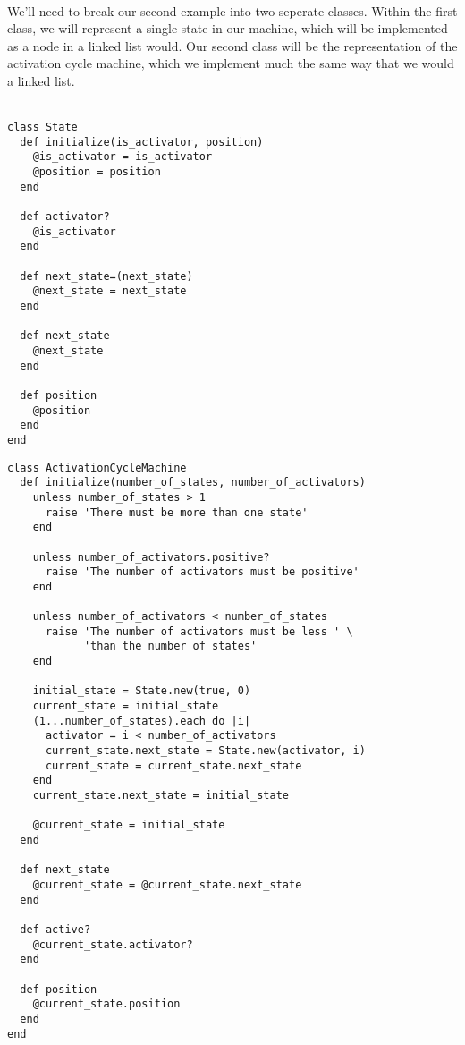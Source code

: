 \documentclass[a4paper,12pt]{article}
\begin{document}
\\
We'll need to break our second example into two seperate classes. Within the first class, we will represent a single state in our machine, which will be implemented as a node in a linked list would. Our second class will be the representation of the activation cycle machine, which we implement much the same way that we would a linked list.\\
\\
\begin{tcolorbox}
\begin{verbatim}
class State
  def initialize(is_activator, position)
    @is_activator = is_activator
    @position = position
  end

  def activator?
    @is_activator
  end
  
  def next_state=(next_state)
  	@next_state = next_state
  end
  
  def next_state
  	@next_state
  end
  
  def position
  	@position
  end
end
\end{verbatim}
\end{tcolorbox}
\begin{tcolorbox}
\begin{verbatim}
class ActivationCycleMachine
  def initialize(number_of_states, number_of_activators)
    unless number_of_states > 1
      raise 'There must be more than one state'
    end

    unless number_of_activators.positive?
      raise 'The number of activators must be positive'
    end

    unless number_of_activators < number_of_states
      raise 'The number of activators must be less ' \
            'than the number of states'
    end

    initial_state = State.new(true, 0)
    current_state = initial_state
    (1...number_of_states).each do |i|
      activator = i < number_of_activators
      current_state.next_state = State.new(activator, i)
      current_state = current_state.next_state
    end
    current_state.next_state = initial_state

    @current_state = initial_state
  end

  def next_state
    @current_state = @current_state.next_state
  end

  def active?
    @current_state.activator?
  end

  def position
    @current_state.position
  end
end
\end{verbatim}
\end{tcolorbox}
\end{document}
